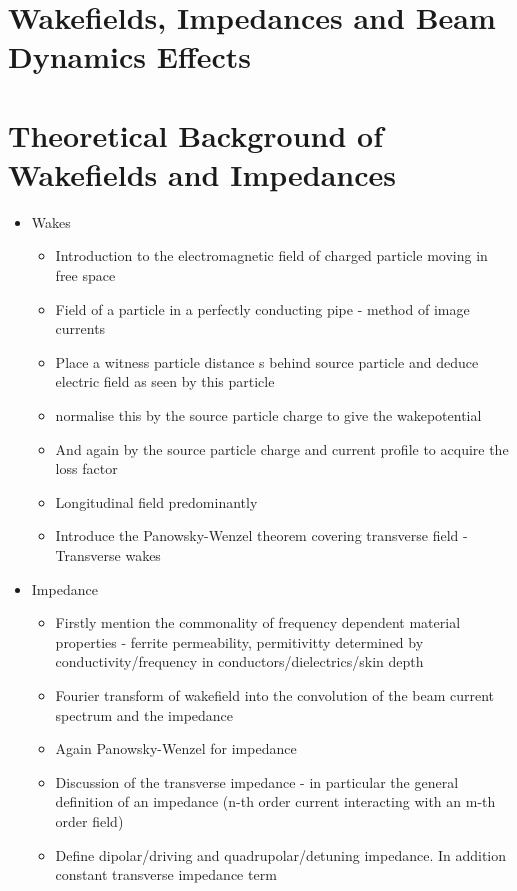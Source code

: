 \section{Wakefields, Impedances and Beam Dynamics Effects}

\section{Theoretical Background of Wakefields and Impedances}

%

\begin{itemize}
\item{Wakes}
\begin{itemize}
\item{Introduction to the electromagnetic field of charged particle moving in free space}
\item{Field of a particle in a perfectly conducting pipe - method of image currents}
\item{Place a witness particle distance s behind source particle and deduce electric field as seen by this particle}
\item{normalise this by the source particle charge to give the wakepotential}
\item{And again by the source particle charge and current profile to acquire the loss factor}
\item{Longitudinal field predominantly}
\item{Introduce the Panowsky-Wenzel theorem covering transverse field - Transverse wakes}
\end{itemize}
\item{Impedance}
\begin{itemize}
\item{Firstly mention the commonality of frequency dependent material properties - ferrite permeability, permitivitty determined by conductivity/frequency in conductors/dielectrics/skin depth}
\item{Fourier transform of wakefield into the convolution of the beam current spectrum and the impedance}
\item{Again Panowsky-Wenzel for impedance}
\item{Discussion of the transverse impedance - in particular the general definition of an impedance (n-th order current interacting with an m-th order field)}
\item{Define dipolar/driving and quadrupolar/detuning impedance. In addition constant transverse impedance term}
\end{itemize}
\end{itemize}


